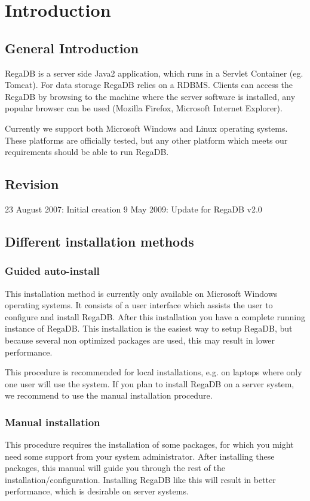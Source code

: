 \chapter{Introduction}
\label{chapter:introduction}

\section{General Introduction}

RegaDB is a server side Java2 application, which runs in a Servlet Container (eg. Tomcat). For data storage RegaDB relies on a RDBMS. Clients can access the RegaDB by browsing to the machine where the server software is installed, any popular browser can be used (Mozilla Firefox, Microsoft Internet Explorer).

Currently we support both Microsoft Windows and Linux operating systems. These platforms are officially tested, but any other platform which meets our requirements should be able to run RegaDB.

\section{Revision}
23 August 2007: Initial creation
9 May 2009: Update for RegaDB v2.0

\section{Different installation methods}
\subsection{Guided auto-install}
This installation method is currently only available on Microsoft Windows operating systems. It consists of a user interface which assists the user to configure and install RegaDB. After this installation you have a complete running instance of RegaDB. This installation is the easiest way to setup RegaDB, but because several non optimized packages are used, this may result in lower performance.

This procedure is recommended for local installations, e.g. on laptops where only one user will use the system. If you plan to install RegaDB on a server system, we recommend to use the manual installation procedure.

\subsection{Manual installation}
This procedure requires the installation of some packages, for which you might need some support from your system administrator. After installing these packages, this manual will guide you through the rest of the installation/configuration. Installing RegaDB like this will result in better performance, which is desirable on server systems.

